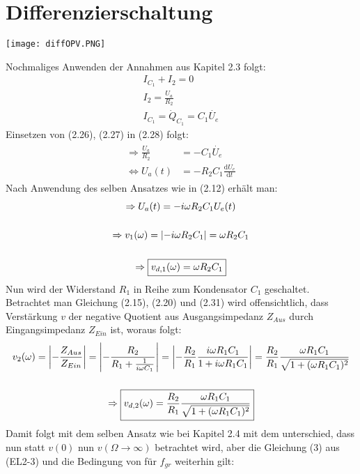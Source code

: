 \section{Differenzierschaltung}
\label{sec:diffschaltung}
\begin{center}
    \texttt{[image: diffOPV.PNG]}
    \label{Differenzierschaltung}
\end{center}
Nochmaliges Anwenden der Annahmen aus Kapitel 2.3 folgt:
\begin{gather}
    I_{C_1} + I_2 = 0\\
    I_2 = \frac{U_a}{R_2}\\
    I_{C_1} = \dot{Q}_{C_1} = C_1 \dot{U_e}
\end{gather}
Einsetzen von (2.26), (2.27) in (2.28) folgt: 
\begin{gather}
    \begin{aligned}
        \Rightarrow \frac{U_a}{R_2}&= -C_1\dot{U_e}\\
        \Leftrightarrow U_a(t)&=-R_2C_1\frac{\text{d}U_e}{\text{d}t}
    \end{aligned}
\end{gather}
Nach Anwendung des selben Ansatzes wie in (2.12) erhält man:
\begin{gather}
    \Rightarrow U_a(t)=-i\omega R_2 C_1 U_e(t)\\[0.5cm]
    \Rightarrow v_1(\omega)=\abs{-i\omega R_2 C_1}=\omega R_2 C_1\\[0.5cm]
    \Rightarrow \boxed{v_{d,1}(\omega) = \omega R_2 C_1}
\end{gather}
Nun wird der Widerstand $R_1$ in Reihe zum Kondensator $C_1$ geschaltet. Betrachtet man Gleichung (2.15), (2.20) und (2.31) wird offensichtlich, dass Verstärkung $v$ der negative Quotient aus Ausgangsimpedanz $Z_{Aus}$ durch Eingangsimpedanz $Z_{Ein}$ ist, woraus folgt: 
\begin{gather}
    v_2(\omega) = \abs{-\frac{Z_{Aus}}{Z_{Ein}}} = \abs{-\frac{R_2}{R_1 + \frac{1}{i\omega C_1}}} = \abs{-\frac{R_2}{R_1} \frac{i\omega R_1C_1}{1+i\omega R_1C_1}} = \frac{R_2}{R_1} \frac{\omega R_1C_1}{\sqrt{1 + (\omega R_1C_1)^2}}\\[0.5cm]
    \Rightarrow \boxed{v_{d,2}(\omega)=\frac{R_2}{R_1} \frac{\omega R_1C_1}{\sqrt{1 + (\omega R_1C_1)^2}}}
\end{gather}
Damit folgt mit dem selben Ansatz wie bei Kapitel 2.4 mit dem unterschied, dass nun statt $v(0)$ nun $v(\Omega\rightarrow \infty)$ betrachtet wird, aber die Gleichung (3) aus (EL2-3) und die Bedingung von für $f_{gr}$ weiterhin gilt:
